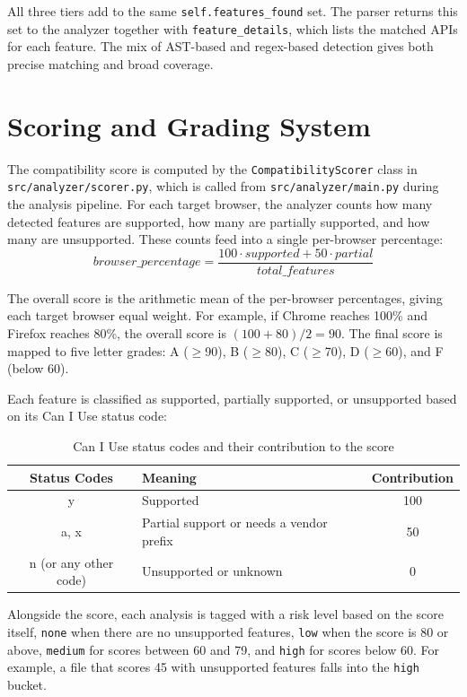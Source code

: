 All three tiers add to the same \texttt{self.features\_found} set. The parser returns this set to the analyzer together with \texttt{feature\_details}, which lists the matched APIs for each feature. The mix of AST-based and regex-based detection gives both precise matching and broad coverage.

\section{Scoring and Grading System}
\label{sec:scoring}

The compatibility score is computed by the \texttt{CompatibilityScorer} class in \texttt{src/analyzer/scorer.py}, which is called from \texttt{src/analyzer/main.py} during the analysis pipeline. For each target browser, the analyzer counts how many detected features are supported, how many are partially supported, and how many are unsupported. These counts feed into a single per-browser percentage:
\[
\mathit{browser\_percentage} = \frac{100 \cdot \mathit{supported} + 50 \cdot \mathit{partial}}{\mathit{total\_features}}
\]

The overall score is the arithmetic mean of the per-browser percentages, giving each target browser equal weight. For example, if Chrome reaches 100\% and Firefox reaches 80\%, the overall score is $(100 + 80) / 2 = 90$. The final score is mapped to five letter grades: A ($\geq$90), B ($\geq$80), C ($\geq$70), D ($\geq$60), and F (below 60).


Each feature is classified as supported, partially supported, or unsupported based on its Can I Use status code:

\begin{table}[H]
    \centering
    \begin{tabular}{|c|l|c|}
        \hline
        \textbf{Status Codes} & \textbf{Meaning} & \textbf{Contribution} \\
        \hline \hline
        y & Supported & 100 \\
        \hline
        a, x & Partial support or needs a vendor prefix & 50 \\
        \hline
        n (or any other code) & Unsupported or unknown & 0 \\
        \hline
    \end{tabular}
    \caption{Can I Use status codes and their contribution to the score}
    \label{tab:status-scores}
\end{table}

Alongside the score, each analysis is tagged with a risk level based on the score itself, \texttt{none} when there are no unsupported features, \texttt{low} when the score is 80 or above, \texttt{medium} for scores between 60 and 79, and \texttt{high} for scores below 60. For example, a file that scores 45 with unsupported features falls into the \texttt{high} bucket.

